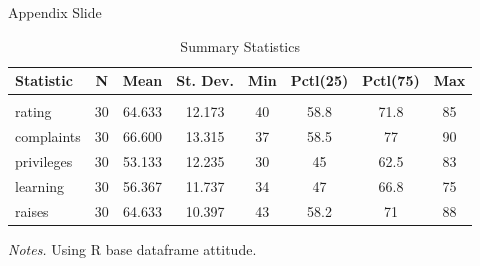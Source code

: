 \documentclass[aspectratio=169,t]{beamer}
\begin{document}
\begin{frame}{Appendix Slide}{\hyperlink{main1}{}}\label{appendix1}
  \begin{table}
  \caption{Summary Statistics}
  \label{appendix_summ_stat}
  \begin{adjustbox}{max width = \textwidth, width = 0.7\textwidth, center}
    \begin{threeparttable}
    \begin{tabular}{@{} lccccccc @{}} 
      \toprule
      Statistic & \multicolumn{1}{c}{N} & \multicolumn{1}{c}{Mean} & \multicolumn{1}{c}{St. Dev.} & \multicolumn{1}{c}{Min} & \multicolumn{1}{c}{Pctl(25)} & \multicolumn{1}{c}{Pctl(75)} & \multicolumn{1}{c}{Max} \\ 
      \hline \\[-1.8ex] 
      rating & 30 & 64.633 & 12.173 & 40 & 58.8 & 71.8 & 85 \\ 
      complaints & 30 & 66.600 & 13.315 & 37 & 58.5 & 77 & 90 \\ 
      privileges & 30 & 53.133 & 12.235 & 30 & 45 & 62.5 & 83 \\ 
      learning & 30 & 56.367 & 11.737 & 34 & 47 & 66.8 & 75 \\ 
      raises & 30 & 64.633 & 10.397 & 43 & 58.2 & 71 & 88 \\ 
      \bottomrule
    \end{tabular} 

    \begin{tablenotes}
      \item \textit{Notes.} Using R base dataframe attitude.
    \end{tablenotes}
    \end{threeparttable}
  \end{adjustbox}
  \end{table}
\end{frame}
\end{document}

